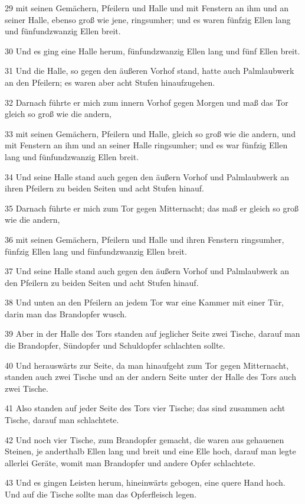 \par 29 mit seinen Gemächern, Pfeilern und Halle und mit Fenstern an ihm und an seiner Halle, ebenso groß wie jene, ringsumher; und es waren fünfzig Ellen lang und fünfundzwanzig Ellen breit.
\par 30 Und es ging eine Halle herum, fünfundzwanzig Ellen lang und fünf Ellen breit.
\par 31 Und die Halle, so gegen den äußeren Vorhof stand, hatte auch Palmlaubwerk an den Pfeilern; es waren aber acht Stufen hinaufzugehen.
\par 32 Darnach führte er mich zum innern Vorhof gegen Morgen und maß das Tor gleich so groß wie die andern,
\par 33 mit seinen Gemächern, Pfeilern und Halle, gleich so groß wie die andern, und mit Fenstern an ihm und an seiner Halle ringsumher; und es war fünfzig Ellen lang und fünfundzwanzig Ellen breit.
\par 34 Und seine Halle stand auch gegen den äußern Vorhof und Palmlaubwerk an ihren Pfeilern zu beiden Seiten und acht Stufen hinauf.
\par 35 Darnach führte er mich zum Tor gegen Mitternacht; das maß er gleich so groß wie die andern,
\par 36 mit seinen Gemächern, Pfeilern und Halle und ihren Fenstern ringsumher, fünfzig Ellen lang und fünfundzwanzig Ellen breit.
\par 37 Und seine Halle stand auch gegen den äußern Vorhof und Palmlaubwerk an den Pfeilern zu beiden Seiten und acht Stufen hinauf.
\par 38 Und unten an den Pfeilern an jedem Tor war eine Kammer mit einer Tür, darin man das Brandopfer wusch.
\par 39 Aber in der Halle des Tors standen auf jeglicher Seite zwei Tische, darauf man die Brandopfer, Sündopfer und Schuldopfer schlachten sollte.
\par 40 Und herauswärts zur Seite, da man hinaufgeht zum Tor gegen Mitternacht, standen auch zwei Tische und an der andern Seite unter der Halle des Tors auch zwei Tische.
\par 41 Also standen auf jeder Seite des Tors vier Tische; das sind zusammen acht Tische, darauf man schlachtete.
\par 42 Und noch vier Tische, zum Brandopfer gemacht, die waren aus gehauenen Steinen, je anderthalb Ellen lang und breit und eine Elle hoch, darauf man legte allerlei Geräte, womit man Brandopfer und andere Opfer schlachtete.
\par 43 Und es gingen Leisten herum, hineinwärts gebogen, eine quere Hand hoch. Und auf die Tische sollte man das Opferfleisch legen.
